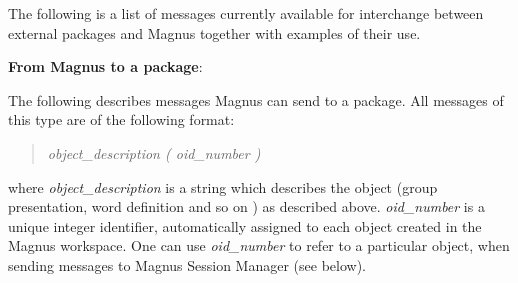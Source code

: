 \documentclass[12pt]{article}
\begin{document}
The following is a list of messages currently available for
interchange between external packages and Magnus together with examples of
their use.

\textbf{From Magnus to a package}:

The following describes messages Magnus can send to a package.
All messages of this type are of the following format:
\begin{quote}\em
object\_description ( oid\_number )
\end{quote}
where \emph{object\_description} is a string which describes the
object (group presentation, word definition and so on ) as
described above. \emph{oid\_number} is a unique integer
identifier, automatically assigned to each object created in the
Magnus workspace. One can use \emph{oid\_number} to
refer to a particular object, when sending messages to Magnus
Session Manager (see below).
\end{document}
